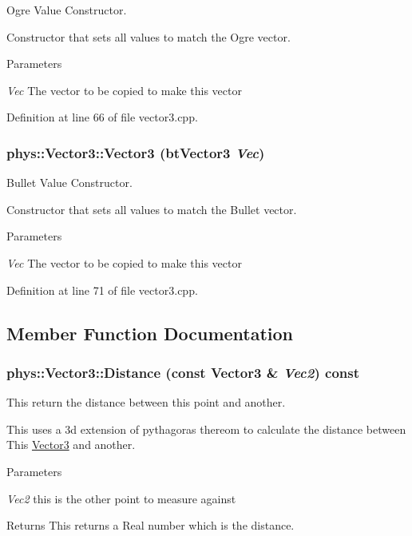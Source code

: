 Ogre Value Constructor. 

Constructor that sets all values to match the Ogre vector. 
\begin{DoxyParams}{Parameters}
\item[{\em Vec}]The vector to be copied to make this vector \end{DoxyParams}


Definition at line 66 of file vector3.cpp.

\hypertarget{classphys_1_1Vector3_a8ff2e969410341eaf328ab76fb3099ed}{
\subsubsection[{Vector3}]{\setlength{\rightskip}{0pt plus 5cm}phys::Vector3::Vector3 (btVector3 {\em Vec})}}
\label{d5/d6a/classphys_1_1Vector3_a8ff2e969410341eaf328ab76fb3099ed}


Bullet Value Constructor. 

Constructor that sets all values to match the Bullet vector. 
\begin{DoxyParams}{Parameters}
\item[{\em Vec}]The vector to be copied to make this vector \end{DoxyParams}


Definition at line 71 of file vector3.cpp.



\subsection{Member Function Documentation}
\hypertarget{classphys_1_1Vector3_a6388c8993a8f09ba2f7fef366858634f}{
\subsubsection[{Distance}]{ phys::Vector3::Distance (const {\bf Vector3} \& {\em Vec2}) const}}
\label{d5/d6a/classphys_1_1Vector3_a6388c8993a8f09ba2f7fef366858634f}


This return the distance between this point and another. 

This uses a 3d extension of pythagoras thereom to calculate the distance between This \hyperlink{classphys_1_1Vector3}{Vector3} and another. 
\begin{DoxyParams}{Parameters}
\item[{\em Vec2}]this is the other point to measure against \end{DoxyParams}
\begin{DoxyReturn}{Returns}
This returns a Real number which is the distance. 
\end{DoxyReturn}


